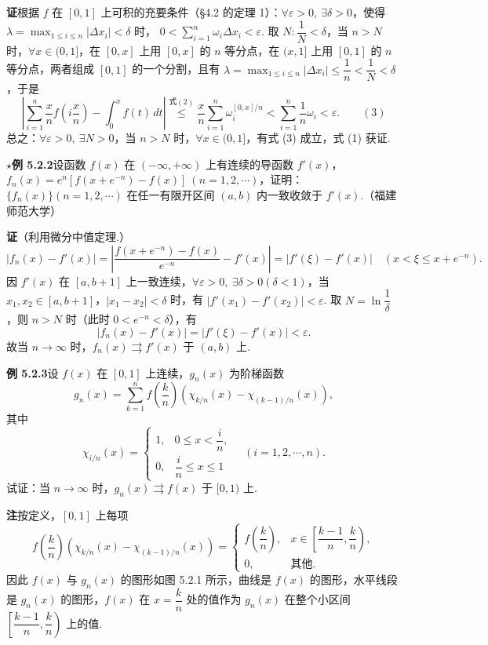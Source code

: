 \documentclass[UTF8,12pt,a4paper,fontset=fandol]{ctexart}
\begin{document}
\noindent\textbf{证}\quad 根据 $f$ 在 $[0,1]$ 上可积的充要条件（§4.2 的定理 1）：$\forall\varepsilon>0,\ \exists\delta>0$，使得
$\lambda=\max_{1\le i\le n}|\Delta x_i|<\delta$ 时，
$0<\sum_{i=1}^n\omega_i\Delta x_i<\varepsilon$. 取 $N:\dfrac1N<\delta$，当
$n>N$ 时，$\forall x\in(0,1]$，在 $[0,x]$ 上用 $[0,x]$ 的 $n$ 等分点，在
$(x,1]$ 上用 $[0,1]$ 的 $n$ 等分点，两者组成 $[0,1]$ 的一个分割，且有
$\lambda=\max_{1\le i\le n}|\Delta x_i|\le\dfrac1n<\dfrac1N<\delta$，于是
\[
  \left|\sum_{i=1}^n\frac{x}{n}f\left(i\frac{x}{n}\right)-\int_0^xf(t)\,dt\right|
  \stackrel{\text{式}(2)}{\le}
  \frac{x}{n}\sum_{i=1}^n\omega_i^{[0,x]/n}
  <\sum_{i=1}^n\frac1n\omega_i<\varepsilon.
\qquad(3)
\]
总之：$\forall\varepsilon>0,\ \exists N>0$，当 $n>N$ 时，$\forall x\in(0,1]$，有式 (3) 成立，式 (1) 获证.

\noindent\textbf{$\star$例 5.2.2}\quad 设函数 $f(x)$ 在 $(-\infty,+\infty)$ 上有连续的导函数
$f'(x)$，$f_n(x)=e^n[f(x+e^{-n})-f(x)]\ (n=1,2,\cdots)$，证明：
$\{f_n(x)\}(n=1,2,\cdots)$ 在任一有限开区间 $(a,b)$ 内一致收敛于 $f'(x)$.（福建师范大学）

\noindent\textbf{证}\quad （利用微分中值定理.）
\[
  |f_n(x)-f'(x)|
  =\left|\frac{f(x+e^{-n})-f(x)}{e^{-n}}-f'(x)\right|
  =|f'(\xi)-f'(x)|\quad(x<\xi\le x+e^{-n}).
\]
因 $f'(x)$ 在 $[a,b+1]$ 上一致连续，$\forall\varepsilon>0,\ \exists\delta>0(\delta<1)$，当
$x_1,x_2\in[a,b+1]$，$|x_1-x_2|<\delta$ 时，有
$|f'(x_1)-f'(x_2)|<\varepsilon$. 取 $N=\ln\dfrac1\delta$，则 $n>N$ 时（此时
$0<e^{-n}<\delta$），有
\[
  |f_n(x)-f'(x)|=|f'(\xi)-f'(x)|<\varepsilon.
\]
故当 $n\to\infty$ 时，$f_n(x)\rightrightarrows f'(x)$ 于 $(a,b)$ 上.

\noindent\textbf{例 5.2.3}\quad 设 $f(x)$ 在 $[0,1]$ 上连续，$g_n(x)$ 为阶梯函数
\[
  g_n(x)=\sum_{k=1}^n f\left(\frac{k}{n}\right)\left(\chi_{k/n}(x)-\chi_{(k-1)/n}(x)\right),
\]
其中
\[
  \chi_{i/n}(x)=
  \begin{cases}
  1, & 0\le x<\dfrac{i}{n},\\
  0, & \dfrac{i}{n}\le x\le1
  \end{cases}
  \quad(i=1,2,\cdots,n).
\]
试证：当 $n\to\infty$ 时，$g_n(x)\rightrightarrows f(x)$ 于 $[0,1)$ 上.

\noindent\textbf{注}\quad 按定义，$[0,1]$ 上每项
\[
  f\left(\frac{k}{n}\right)\left(\chi_{k/n}(x)-\chi_{(k-1)/n}(x)\right)
  =
  \begin{cases}
  f\left(\dfrac{k}{n}\right), & x\in\left[\dfrac{k-1}{n},\dfrac{k}{n}\right),\\
  0, & \text{其他}.
  \end{cases}
\]
因此 $f(x)$ 与 $g_n(x)$ 的图形如图 5.2.1 所示，曲线是 $f(x)$ 的图形，水平线段是
$g_n(x)$ 的图形，$f(x)$ 在 $x=\dfrac{k}{n}$ 处的值作为
$g_n(x)$ 在整个小区间 $\left[\dfrac{k-1}{n},\dfrac{k}{n}\right)$ 上的值.
\end{document}
